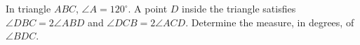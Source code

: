 In triangle $ABC$, $\angle A=120^\circ$. A point $D$ inside the triangle satisfies $\angle DBC=2\angle ABD$ and $\angle DCB=2\angle ACD$. Determine the measure, in degrees, of $\angle BDC$.
